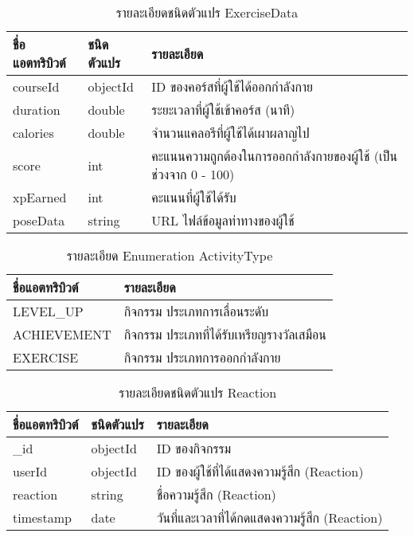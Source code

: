 \begin{table}
    \caption{รายละเอียดชนิดตัวแปร ExerciseData}
    \begin{tabularx}{\textwidth}{ | l | l | X | }
        \hline
        \bf ชื่อแอตทริบิวต์ & \bf ชนิดตัวแปร & \bf รายละเอียด \\\hline
        courseId & objectId & ID ของคอร์สที่ผู้ใช้ได้ออกกำลังกาย\\\hline
        duration & double & ระยะเวลาที่ผู้ใช้เข้าคอร์ส (นาที)\\\hline
        calories & double & จำนวนแคลอรีที่ผู้ใช้ได้เผาผลาญไป\\\hline
        score & int & คะแนนความถูกต้องในการออกกำลังกายของผู้ใช้ (เป็นช่วงจาก 0 - 100)\\\hline
        xpEarned & int & คะแนนที่ผู้ใช้ได้รับ\\\hline
        poseData & string & URL ไฟล์ข้อมูลท่าทางของผู้ใช้\\\hline
    \end{tabularx}
\end{table}

\begin{table}
    \caption{รายละเอียด Enumeration ActivityType}
    \begin{tabularx}{\textwidth}{ | l | X | }
        \hline
        \bf ชื่อแอตทริบิวต์ & \bf รายละเอียด \\\hline
        LEVEL\_UP & กิจกรรม ประเภทการเลื่อนระดับ\\\hline
        ACHIEVEMENT & กิจกรรม ประเภทที่ได้รับเหรียญรางวัลเสมือน\\\hline
        EXERCISE & กิจกรรม ประเภทการออกกำลังกาย\\\hline
    \end{tabularx}
\end{table}

\begin{table}
    \caption{รายละเอียดชนิดตัวแปร Reaction}
    \begin{tabularx}{\textwidth}{ | l | l | X | }
        \hline
        \bf ชื่อแอตทริบิวต์ & \bf ชนิดตัวแปร & \bf รายละเอียด \\\hline
        \_id & objectId & ID ของกิจกรรม\\\hline
        userId & objectId & ID ของผู้ใช้ที่ได้แสดงความรู้สึก (Reaction)\\\hline
        reaction & string & ชื่อความรู้สึก (Reaction)\\\hline
        timestamp & date & วันที่และเวลาที่ได้กดแสดงความรู้สึก (Reaction)\\\hline
    \end{tabularx}
\end{table}

